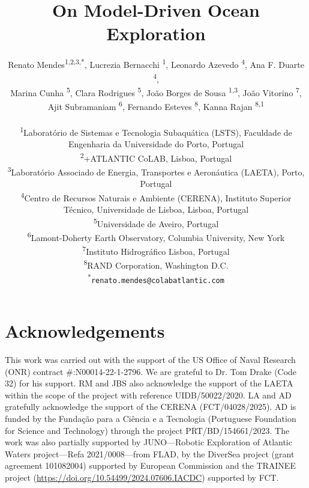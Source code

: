 \documentclass[11pt]{article}
\title{On Model-Driven Ocean Exploration}
\author{
Renato Mendes\textsuperscript{1,2,3,*},
Lucrezia Bernacchi \textsuperscript{1},
Leonardo Azevedo \textsuperscript{4},
Ana F. Duarte \textsuperscript{4},\\
Marina Cunha \textsuperscript{5},
Clara Rodrigues \textsuperscript{5},
João Borges de Sousa \textsuperscript{1,3},
João Vitorino \textsuperscript{7},\\
Ajit Subramaniam \textsuperscript{6},
Fernando Esteves \textsuperscript{8},
Kanna Rajan \textsuperscript{8,1}
\\
\\
\textsuperscript{1}{\scriptsize Laboratório de Sistemas e Tecnologia Subaquática (LSTS), Faculdade de Engenharia da Universidade do Porto, Portugal}\\
\textsuperscript{2}{\scriptsize +ATLANTIC CoLAB, Lisboa, Portugal}\\
\textsuperscript{3}{\scriptsize Laboratório Associado de Energia, Transportes e Aeronáutica (LAETA), Porto, Portugal}\\
\textsuperscript{4}{\scriptsize Centro de Recursos Naturais e Ambiente (CERENA), Instituto Superior T\'{e}cnico, Universidade de Lisboa, Lisboa, Portugal}\\
\textsuperscript{5}{\scriptsize Universidade de Aveiro, Portugal}\\
\textsuperscript{6}{\scriptsize Lamont-Doherty Earth Observatory, Columbia University, New York}\\
\textsuperscript{7}{\scriptsize Instituto Hidrogr{\'a}fico Lisboa, Portugal}\\
\textsuperscript{8}{\scriptsize RAND Corporation, Washington D.C.}\\
\textsuperscript{*}\texttt{{\scriptsize renato.mendes@colabatlantic.com}}
}
\date{}
\begin{document}
\maketitle






\section{Acknowledgements}

This work was carried out with the support of the US Office of Naval
Research (ONR) contract \#:N00014-22-1-2796. We are grateful to
Dr. Tom Drake (Code 32) for his support. RM and JBS also acknowledge
the support of the LAETA within the scope of the project with
reference UIDB/50022/2020. LA and AD gratefully acknowledge the
support of the CERENA (FCT/04028/2025). AD is funded by the
Funda\c{c}\~{a}o para a Ci\^{e}ncia e a Tecnologia (Portuguese
Foundation for Science and Technology) through the project
PRT/BD/154661/2023. The work was also partially supported by
JUNO—Robotic Exploration of Atlantic Waters project—Refa
2021/0008—from FLAD, by the DiverSea project (grant agreement
101082004) supported by European Commission and the TRAINEE project
(\url{https://doi.org/10.54499/2024.07606.IACDC}) supported by FCT.


\footnotesize{
  
}
\end{document}
